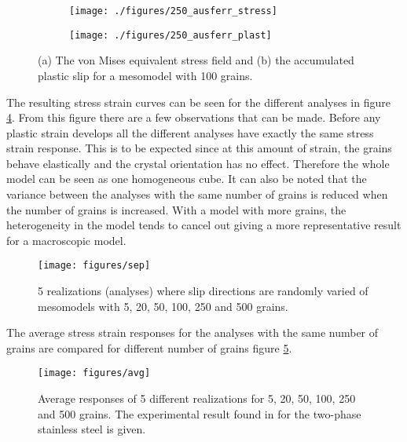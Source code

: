 \documentclass[crystal_plast.tex]{subfiles}
\begin{document}
\begin{figure}[htpb!]
\centering
\begin{subfigure}{.8\textwidth}
  \centering
  \texttt{[image: ./figures/250\_ausferr\_stress]}
  \caption{}
  \label{fig:ausferr_stress}
\end{subfigure}%

\begin{subfigure}{.8\textwidth}
  \centering
  \texttt{[image: ./figures/250\_ausferr\_plast]}
  \caption{}
  \label{fig:ausferr_plast}
\end{subfigure}
\caption{(a) The von Mises equivalent stress field and (b) the accumulated plastic slip for a mesomodel with 100 grains.}
\label{fig:ausferr_col}
\end{figure}


The resulting stress strain curves can be seen for the different analyses in figure \ref{fig:sep}. From this figure there are a few observations that can be made. Before any plastic strain develops all the different analyses have exactly the same stress strain response. This is to be expected since at this amount of strain, the grains behave elastically and the crystal orientation has no effect. Therefore the whole model can be seen as one homogeneous cube. It can also be noted that the variance between the analyses with the same number of grains is reduced when the number of grains is increased. With a model with more grains, the heterogeneity in the model tends to cancel out giving a more representative result for a macroscopic model.


 \begin{figure}[ht]
\centering
\texttt{[image: figures/sep]}
\caption{5 realizations (analyses) where slip directions are randomly varied of mesomodels with 5, 20, 50, 100, 250 and 500 grains.}
\label{fig:sep}
\end{figure}

The average stress strain responses for the analyses with the same number of grains are compared for different number of grains figure \ref{fig:avg}.

\begin{figure}[htpb!]
\centering
\texttt{[image: figures/avg]}
\caption{Average responses of 5 different realizations for 5, 20, 50, 100, 250 and 500 grains. The experimental result found in \cite{lillekh} for the two-phase stainless steel is given.}
\label{fig:avg}
\end{figure}
\end{document}
